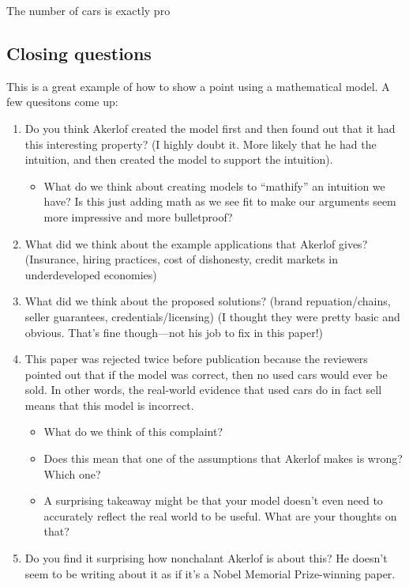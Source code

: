\documentclass[11pt]{article}
\begin{document}
The number of cars is exactly pro


\subsection{Closing questions}

This is a great example of how to show a point using a mathematical model. A few quesitons come up:
\begin{enumerate}
    \item Do you think Akerlof created the model first and then found out that it had this interesting property? (I highly doubt it. More likely that he had the intuition, and then created the model to support the intuition).
    \begin{itemize}
        \item What do we think about creating models to ``mathify'' an intuition we have? Is this just adding math as we see fit to make our arguments seem more impressive and more bulletproof? 
    \end{itemize}
    \item What did we think about the example applications that Akerlof gives? (Insurance, hiring practices, cost of dishonesty, credit markets in underdeveloped economies)
    \item What did we think about the proposed solutions? (brand repuation/chains, seller guarantees, credentials/licensing) (I thought they were pretty basic and obvious. That's fine though---not his job to fix in this paper!)
    \item This paper was rejected twice before publication because the reviewers pointed out that if the model was correct, then no used cars would ever be sold. In other words, the real-world evidence that used cars do in fact sell means that this model is incorrect.
    \begin{itemize}
        \item What do we think of this complaint?
        \item Does this mean that one of the assumptions that Akerlof makes is wrong? Which one?
        \item A surprising takeaway might be that your model doesn't even need to accurately reflect the real world to be useful. What are your thoughts on that?
    \end{itemize}
    \item Do you find it surprising how nonchalant Akerlof is about this? He doesn't seem to be writing about it as if it's a Nobel Memorial Prize-winning paper.
\end{enumerate}
\end{document}
